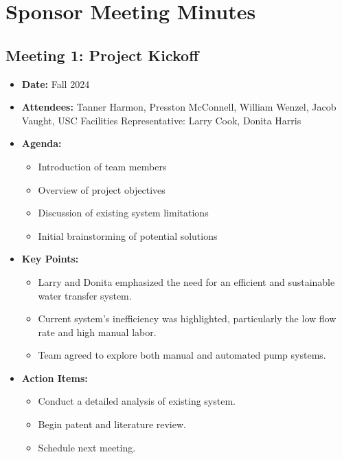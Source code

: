 \documentclass[12pt]{report}
\begin{document}
    \section{Sponsor Meeting Minutes}
    \subsection{Meeting 1: Project Kickoff}
    \begin{itemize}
        \item \textbf{Date:} Fall 2024
        \item \textbf{Attendees:} Tanner Harmon, Presston McConnell, William Wenzel, Jacob Vaught, USC Facilities Representative: Larry Cook, Donita Harris
        \item \textbf{Agenda:}
        \begin{itemize}
            \item Introduction of team members
            \item Overview of project objectives
            \item Discussion of existing system limitations
            \item Initial brainstorming of potential solutions
        \end{itemize}
        \item \textbf{Key Points:}
        \begin{itemize}
            \item Larry and Donita emphasized the need for an efficient and sustainable water transfer system.
            \item Current system's inefficiency was highlighted, particularly the low flow rate and high manual labor.
            \item Team agreed to explore both manual and automated pump systems.
        \end{itemize}
        \item \textbf{Action Items:}
        \begin{itemize}
            \item Conduct a detailed analysis of existing system.
            \item Begin patent and literature review.
            \item Schedule next meeting.
        \end{itemize}
    \end{itemize}
\end{document}

